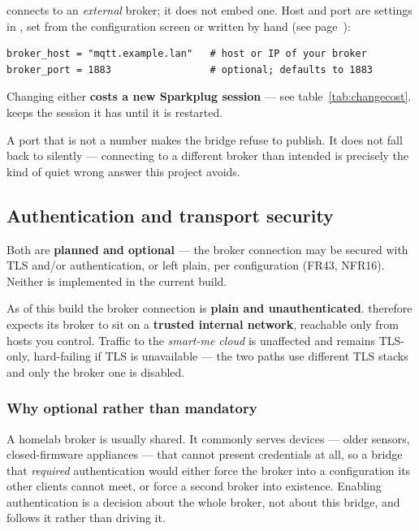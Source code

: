 \prog connects to an \emph{external} broker; it does not embed one. Host and port are
settings in , set from the configuration screen or written by hand
(see page~\pageref{ch:config}):

\begin{lstlisting}
broker_host = "mqtt.example.lan"   # host or IP of your broker
broker_port = 1883                 # optional; defaults to 1883
\end{lstlisting}

\begin{note}
Changing either \textbf{costs a new Sparkplug session} --- see
table~\ref{tab:changecost}. \prog keeps the session it has until it is restarted.
\end{note}

A port that is not a number makes the bridge refuse to publish. It does not fall back to
 silently --- connecting to a different broker than intended is precisely the
kind of quiet wrong answer this project avoids.

\subsection{Authentication and transport security}

Both are \textbf{planned and optional} --- the broker connection may be secured with TLS
and/or authentication, or left plain, per configuration (FR43, NFR16). Neither is
implemented in the current build.

\begin{warning}
As of this build the broker connection is \textbf{plain and unauthenticated}. \prog
therefore expects its broker to sit on a \textbf{trusted internal network}, reachable only
from hosts you control. Traffic to the \emph{smart-me cloud} is unaffected and remains
TLS-only, hard-failing if TLS is unavailable --- the two paths use different TLS stacks
and only the broker one is disabled.
\end{warning}

\subsubsection*{Why optional rather than mandatory}

A homelab broker is usually shared. It commonly serves devices --- older sensors,
closed-firmware appliances --- that cannot present credentials at all, so a bridge that
\emph{required} authentication would either force the broker into a configuration its
other clients cannot meet, or force a second broker into existence. Enabling
authentication is a decision about the whole broker, not about this bridge, and \prog
follows it rather than driving it.

